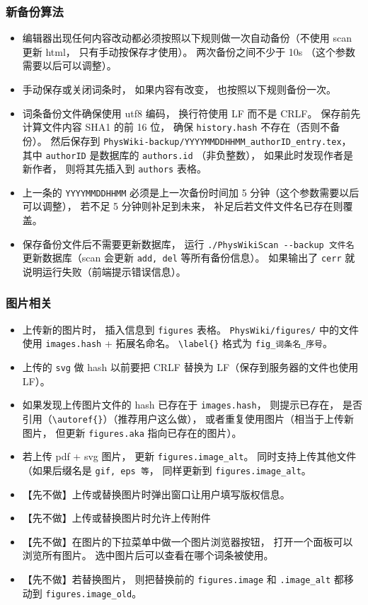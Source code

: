 \subsubsection{新备份算法}
\begin{itemize}
\item 编辑器出现任何内容改动都必须按照以下规则做一次自动备份（不使用 scan 更新 html， 只有手动按保存才使用）。 两次备份之间不少于 10s （这个参数需要以后可以调整）。
\item 手动保存或关闭词条时， 如果内容有改变， 也按照以下规则备份一次。
\item 词条备份文件确保使用 utf8 编码， 换行符使用 LF 而不是 CRLF。 保存前先计算文件内容 SHA1 的前 16 位， 确保 \verb|history.hash| 不存在（否则不备份）。 然后保存到 \verb|PhysWiki-backup/YYYYMMDDHHMM_authorID_entry.tex|， 其中 \verb|authorID| 是数据库的 \verb|authors.id| （非负整数）， 如果此时发现作者是新作者， 则将其先插入到 \verb|authors| 表格。
\item 上一条的 \verb|YYYYMMDDHHMM| 必须是上一次备份时间加 5 分钟（这个参数需要以后可以调整）， 若不足 5 分钟则补足到未来， 补足后若文件文件名已存在则覆盖。
\item 保存备份文件后不需要更新数据库， 运行 \verb|./PhysWikiScan --backup 文件名| 更新数据库（scan 会更新 \verb|add, del| 等所有备份信息）。 如果输出了 \verb|cerr| 就说明运行失败（前端提示错误信息）。
\end{itemize}

\subsubsection{图片相关}
\begin{itemize}
\item 上传新的图片时， 插入信息到 \verb|figures| 表格。 \verb|PhysWiki/figures/| 中的文件使用 \verb|images.hash| + 拓展名命名。 \verb|\label{}| 格式为 \verb|fig_词条名_序号|。
\item 上传的 \verb|svg| 做 hash 以前要把 CRLF 替换为 LF（保存到服务器的文件也使用 LF）。
\item 如果发现上传图片文件的 hash 已存在于 \verb|images.hash|， 则提示已存在， 是否引用（\verb|\autoref{}|）（推荐用户这么做）， 或者重复使用图片（相当于上传新图片， 但更新 \verb|figures.aka| 指向已存在的图片）。 
\item 若上传 pdf + svg 图片， 更新 \verb|figures.image_alt|。 同时支持上传其他文件（如果后缀名是 \verb|gif, eps 等|， 同样更新到 \verb|figures.image_alt|。
\item 【先不做】上传或替换图片时弹出窗口让用户填写版权信息。
\item 【先不做】上传或替换图片时允许上传附件
\item 【先不做】在图片的下拉菜单中做一个图片浏览器按钮， 打开一个面板可以浏览所有图片。 选中图片后可以查看在哪个词条被使用。
\item 【先不做】若替换图片， 则把替换前的 \verb|figures.image| 和 \verb|.image_alt| 都移动到 \verb|figures.image_old|。 
\end{itemize}

